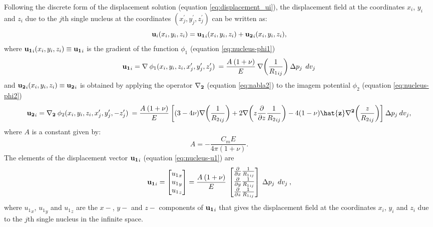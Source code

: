 \documentclass[journal abbreviation, manuscript]{copernicus}
\begin{document}
Following the discrete form of the displacement solution (equation \ref{eq:displacement_ui}), 
the displacement field at the coordinates $x_i$, $y_i$  and $z_i$  due to the $j$th single nucleus at the coordinates $(x^{\prime}_{j}, y^{\prime}_{j}, z^{\prime}_{j})$ can be written as:
\begin{equation}
{\bf{u}}_{i} (x_i,y_i,z_i) = {\bf{u_{1}}}_{i} (x_i,y_i,z_i) + {\bf{u_{2}}}_{i} (x_i,y_i,z_i), 
\label{eq:nucleus-ui_total}
\end{equation}
where ${\bf{u_{1}}}_{i} (x_i,y_i,z_i) \equiv {\bf{u_{1}}}_{i} $ is the gradient of the function $\phi_1$ (equation \ref{eq:nucleus-phi1}) 
\begin{equation}
{\bf{u_{1}}}_{i}  = {\bf{\nabla}} \: {\phi_{1}(x_{i}, y_{i}, z_{i}, x^{\prime}_{j}, y^{\prime}_{j}, z^{\prime}_{j})} \:
= \frac{A  \: (1 + \nu)}{E} \: {\bf{\nabla}} \bigg( {\frac{1}{{R_1}_{ij}}} \bigg) 
\: \Delta p_{j} \: \:dv_j
\label{eq:nucleus-u1}
\end{equation}
and ${\bf{u_{2}}}_{i} (x_i,y_i,z_i) \equiv {\bf{u_{2}}}_{i} $ is obtained by  applying the operator ${\bf{{\nabla}_{2}}}$ (equation \ref{eq:nabla2}) to the imagem potential $\phi_2$ (equation \ref{eq:nucleus-phi2})
\begin{equation}
{\bf{u_{2}}}_{i} = {\bf{{\nabla}_{2}}} \: {\phi_{2}(x_{i}, y_{i}, z_{i}, x^{\prime}_{j}, y^{\prime}_{j}, -z^{\prime}_{j})} \:  
= \frac{A  \: (1 + \nu)}{E} \: 
\bigg[ 
(3 - 4\nu){\bf{\nabla}} \bigg(  {\frac{1}{{R_2}_{ij}}} \bigg)     
+ 2 {\bf{\nabla}} \bigg( z \frac{\partial }{\partial z} {\frac{1}{{R_2}_{ij}}} \bigg)  
- 4(1- \nu){\bf{\hat{z}}} {\bf{{\nabla}^{2}}}  \bigg( {\frac{z}{{R_2}_{ij}}} \bigg)
\bigg]   \: \Delta p_{j}  \:dv_j , 
\label{eq:nucleus-u2}
\end{equation}
where  $A$ is a constant given by: 
\begin{equation}
A = - \frac{C_m E}{4 \pi (1 + \nu)}.  
\label{eq:nucleus-A}
\end{equation}
The elements  of the displacement vector ${\bf{u_{1}}}_{i}$ (equation \ref{eq:nucleus-u1}) are
\begin{equation}
{\bf{u_{1}}}_{i}  = 
\begin{bmatrix} 
{u_{1}}_x \\
{u_{1}}_y \\
{u_{1}}_z
\end{bmatrix}
 = \frac{A  \: (1 + \nu)}{E} \: 
\begin{bmatrix} 
\frac{\partial }{\partial x} {\frac{1}{{R_1}_{ij}}}  \\
\frac{\partial }{\partial y} {\frac{1}{{R_1}_{ij}}}  \\
\frac{\partial }{\partial z} {\frac{1}{{R_1}_{ij}}} 
\end{bmatrix}
 \: \Delta p_{j} \: \:dv_j \:  ,  
\label{eq:nucleus-u1-vector}
\end{equation}
where ${u_{1}}_x$, ${u_{1}}_y$ and ${u_{1}}_z$ are the $x-$, $y-$  and $z-$ components
of  ${\bf{u_{1}}}_{i} $ that gives the displacement field at the coordinates $x_i$, $y_i$  and $z_i$  due to the $j$th single nucleus in the infinite space.
\end{document}
